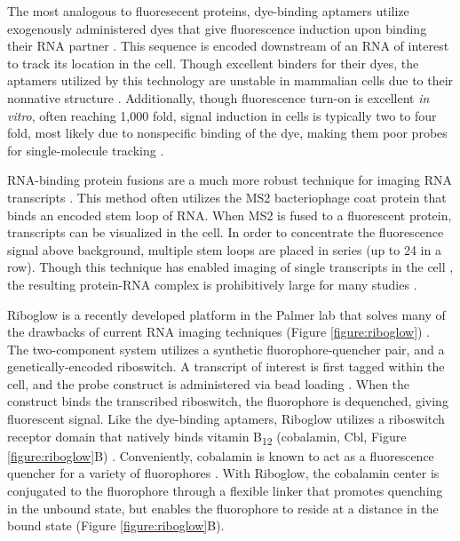 The most analogous to fluoresecent proteins, dye-binding aptamers utilize exogenously administered dyes that give fluorescence induction upon binding their RNA partner  \cite{PaigeRNAMimicsGreen2011,FilonovBroccoliRapidSelection2014,AutourFluorogenicRNAMango2018,DolgosheinaRNAMangoAptamerFluorophore2014}.
This sequence is encoded downstream of an RNA of interest to track its location in the cell. Though excellent binders for their dyes, the aptamers utilized by this technology are unstable in mammalian cells due to their nonnative structure \cite{EtzelSyntheticRiboswitchesPlug2017,IiiStructuralbasishighaffinity2017,WarnerStructuralbasisactivity2014,JengFluorophoreligandbinding2016}.
Additionally, though fluorescence turn-on is excellent \textit{in vitro}, often reaching 1,000 fold, signal induction in cells is typically two to four fold, most likely due to nonspecific binding of the dye, making them poor probes for single-molecule tracking \cite{AutourFluorogenicRNAMango2018}.

RNA-binding protein fusions are a much more robust technique for imaging RNA transcripts  \cite{FuscoSinglemRNAMolecules2003}. This method often utilizes the MS2 bacteriophage coat protein that binds an encoded stem loop of RNA. When MS2 is fused to a fluorescent protein, transcripts can be visualized in the cell. In order to concentrate the fluorescence signal above background, multiple stem loops are placed in series (up to 24 in a row). Though this technique has enabled imaging of single transcripts in the cell  \cite{MorisakiRealtimequantificationsingle2016,FuscoSinglemRNAMolecules2003}, the resulting protein-RNA complex is prohibitively large for many studies \cite{TutucciimprovedMS2system2018}.

Riboglow is a recently developed platform in the Palmer lab that solves many of the drawbacks of current RNA imaging techniques (Figure \ref{figure:riboglow}) \cite{BraselmannDevelopmentriboswitchbasedplatform2017}. The two-component system utilizes a synthetic fluorophore-quencher pair, and a genetically-encoded riboswitch. A transcript of interest is first tagged within the cell, and the probe construct is administered via bead loading \cite{McNeilGlassbeadsload1987,Hayashi-TakanakaTrackingepigenetichistone2011,MorisakiRealtimequantificationsingle2016}.
When the construct binds the transcribed riboswitch, the fluorophore is dequenched, giving fluorescent signal. Like the dye-binding aptamers, Riboglow utilizes a riboswitch receptor domain that natively binds vitamin B\textsubscript{12} (cobalamin, Cbl, Figure \ref{figure:riboglow}B) \cite{JohnsonJrB12cofactorsdirectly2012}.
Conveniently, cobalamin is known to act as a fluorescence quencher for a variety of fluorophores \cite{RosendahlSynthesisbiologicalactivity1982,LeeDesignSynthesisCharacterization2009,SmeltzerSynthesisCharacterizationFluorescent2001}.
With Riboglow, the cobalamin center is conjugated to the fluorophore through a flexible linker that promotes quenching in the unbound state, but enables the fluorophore to reside at a distance in the bound state (Figure \ref{figure:riboglow}B).


